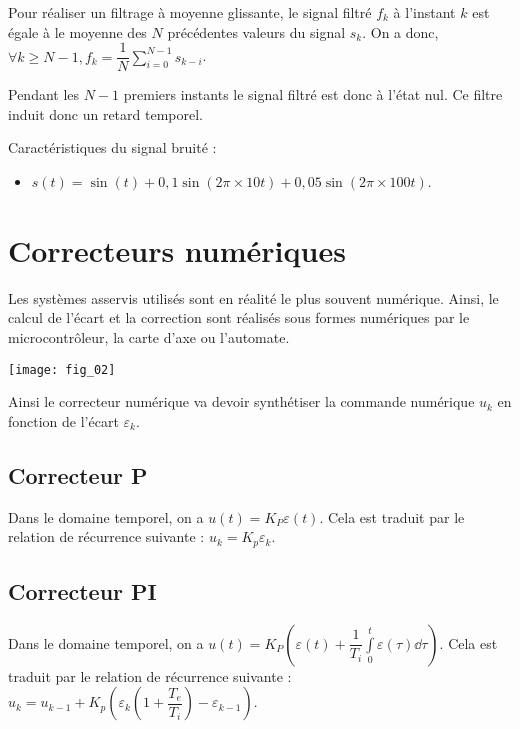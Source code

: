 Pour réaliser un filtrage à moyenne glissante, le signal filtré $f_k$ à l'instant $k$ est égale à le moyenne des $N$ précédentes valeurs du signal $s_k$. On a donc, $\forall k \geq N-1, f_k = \dfrac{1}{N}\sum\limits_{i=0}^{N-1} s_{k-i}$.

Pendant les $N-1$ premiers instants le signal filtré est donc à l'état nul. Ce filtre induit donc un retard temporel.

Caractéristiques du signal bruité :
\begin{itemize}
\item $s(t)=\sin(t) + 0,1\sin(2\pi \times 10 t)+ 0,05\sin(2\pi \times 100 t)$.
\end{itemize}




\section{Correcteurs numériques}
 
 Les systèmes asservis utilisés sont en réalité le plus souvent numérique. Ainsi, le calcul de l'écart et la correction sont 
 réalisés sous formes numériques par le microcontrôleur, la carte d'axe ou l'automate. 
 
 \begin{center}
\texttt{[image: fig\_02]}
\end{center}

Ainsi le correcteur numérique va devoir synthétiser la commande numérique $u_k$ en fonction de l'écart $\varepsilon_k$. 


 
\subsection{Correcteur P}
\begin{defi}
Dans le domaine temporel, on a $u(t)=K_P \varepsilon(t)$. Cela est traduit par le relation de récurrence suivante : 
$u_k = K_p \varepsilon_k$.
\end{defi}
\subsection{Correcteur PI}
\begin{defi}
Dans le domaine temporel, on a $u(t)=K_P  \left(\varepsilon(t)+\dfrac{1}{T_i}\int\limits_0^t \varepsilon(\tau) \dd \tau \right)$. Cela est traduit par le relation de récurrence suivante : 
$u_k = u_{k-1} +  K_p \left( \varepsilon_k \left( 1+\dfrac{T_e}{T_i}\right) - \varepsilon_{k-1} \right)$.
\end{defi}


